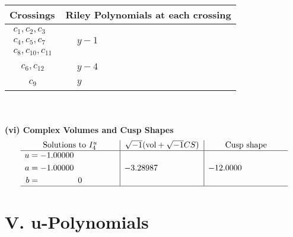 \documentclass[1p]{elsarticle_modified}
\theoremstyle{definition}
\newcommand{\I}{\sqrt{-1}}
\begin{document}
\begin{tabular}{m{50pt}|m{274pt}}
Crossings & \hspace{64pt}Riley Polynomials at each crossing \\
\hline $$\begin{aligned}c_{1},c_{2},c_{3}\\c_{4},c_{5},c_{7}\\c_{8},c_{10},c_{11}\end{aligned}$$&$\begin{aligned}
&y-1
\end{aligned}$\\
\hline $$\begin{aligned}c_{6},c_{12}\end{aligned}$$&$\begin{aligned}
&y-4
\end{aligned}$\\
\hline $$\begin{aligned}c_{9}\end{aligned}$$&$\begin{aligned}
&y
\end{aligned}$\\
\hline
\end{tabular}\\~\\
\newpage\flushleft \textbf{(vi) Complex Volumes and Cusp Shapes}
$$\begin{array}{c|c|c}  
\text{Solutions to }I^u_{4}& \I (\text{vol} + \sqrt{-1}CS) & \text{Cusp shape}\\
 \hline 
\begin{aligned}
u &= -1.00000\phantom{ +0.000000I} \\
a &= -1.00000\phantom{ +0.000000I} \\
b &= \phantom{-0.000000 } 0\end{aligned}
 & -3.28987\phantom{ +0.000000I} & -12.0000\phantom{ +0.000000I}\\
 \hline 
 \end{array}$$\newpage
\newpage\renewcommand{\arraystretch}{1}
\centering \section*{ V. u-Polynomials}
\end{document}
